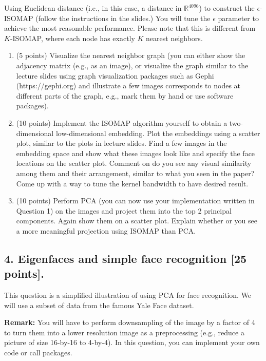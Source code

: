 \documentclass[twoside,10pt]{article}
\begin{document}
Using Euclidean distance (i.e., in this case, a distance in $\mathbb R^{4096}$) to construct the $\epsilon$-ISOMAP (follow the instructions in the slides.) You will tune the $\epsilon$ parameter to achieve the most reasonable performance. Please note that this is different from $K$-ISOMAP, where each node has exactly $K$ nearest neighbors.

\begin{enumerate} 

\item (5 points) Visualize the nearest neighbor graph (you can either show the adjacency matrix (e.g., as an image), or visualize the graph similar to the lecture slides using graph visualization packages such as Gephi (\textsf{https://gephi.org}) and illustrate a few images corresponds to nodes at different parts of the graph, e.g., mark them by hand or use software packages).
 
\item (10 points) Implement the ISOMAP algorithm yourself to obtain a two-dimensional low-dimensional embedding. Plot the embeddings using a scatter plot, similar to the plots in lecture slides. Find a few images in the embedding space and show what these images look like and specify the face locations on the scatter plot. Comment on do you see any visual similarity among them and their arrangement, similar to what you seen in the paper? Come up with a way to tune the kernel bandwidth to have desired result.

\item (10 points) Perform PCA (you can now use your implementation written in Question 1) on the images and project them into the top 2 principal components. Again show them on a scatter plot. Explain whether or you see a more meaningful projection using ISOMAP than PCA. 

\end{enumerate}




 \clearpage

\subsection*{4. Eigenfaces and simple face recognition [25 points].}

This question is a simplified illustration of using PCA for face recognition. We will use a subset of data from the famous Yale Face dataset. 

\vspace{.1in}
\noindent
{\bf Remark:} You will have to perform downsampling of the image by a factor of 4 to turn them into a lower resolution image as a preprocessing (e.g., reduce a picture of size 16-by-16 to 4-by-4). In this question, you can implement your own code or call packages. 
\end{document}

